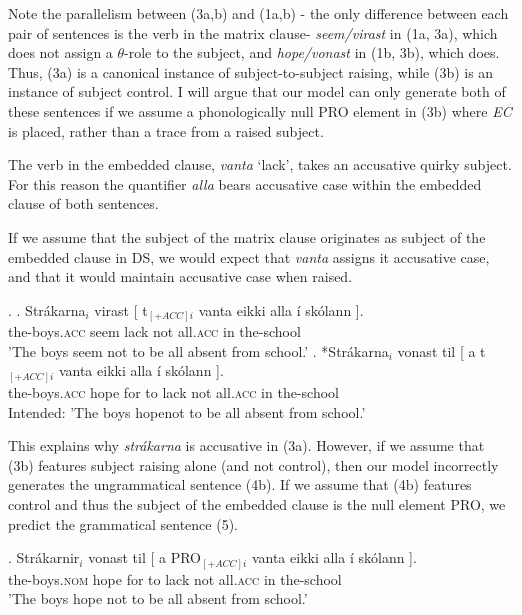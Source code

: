 \documentclass[a4paper, 11pt]{article}
\begin{document}
\begin{enumerate}[label=\textbf{\arabic*.}]
  Note the parallelism between (3a,b) and (1a,b) - the only difference between each pair of
  sentences is the verb in the matrix clause- \emph{seem/virast} in (1a, 3a), which does not assign
  a $\theta$-role to the subject, and \emph{hope/vonast} in (1b, 3b), which does. Thus, (3a)
  is a canonical instance of subject-to-subject raising, while (3b) is an instance of subject control.
  I will argue that our model can only generate both of these sentences if we assume a
  phonologically null PRO element in (3b) where \emph{EC} is placed, rather than a trace from
  a raised subject.

  The verb in the embedded clause, \emph{vanta} `lack', takes an accusative quirky
  subject. For this reason the quantifier \emph{alla} bears accusative case within the
  embedded clause of both sentences.

  If we assume that the subject of the matrix clause originates as subject of the embedded clause
  in DS, we would expect that \emph{vanta} assigns it accusative case, and that it would
  maintain accusative case when raised.

  \ex.
  \ag. Strákarna$_{i}$ virast 
  [ t$_{[+ACC]i}$  vanta eikki alla í skólann ].\\
  the-boys\textsc{.acc} seem {} {} lack not all\textsc{.acc} in the-school\\
  \trans 'The boys seem not to be all absent from school.'
  \bg. *Strákarna$_{i}$ vonast til
  [ a t$_{[+ACC]i}$  vanta eikki alla í skólann ].\\
  the-boys\textsc{.acc} hope for {} to {} lack not all\textsc{.acc} in the-school\\
  \trans Intended: 'The boys hopenot to be all absent from school.' 
  
  This explains why \emph{strákarna} is accusative in (3a). However, if we assume that
  (3b) features subject raising alone (and not control), then our model incorrectly generates
  the ungrammatical sentence (4b). If we assume that (4b) features control and thus the subject
  of the embedded clause is the null element PRO, we predict the grammatical sentence (5).

  \exg. Strákarnir$_{i}$ vonast til
  [ a PRO$_{[+ACC]i}$  vanta eikki alla í skólann ].\\
  the-boys\textsc{.nom} hope for {} to {} lack not all\textsc{.acc} in the-school\\
  \trans 'The boys hope not to be all absent from school.'


\end{enumerate}
\end{document}
